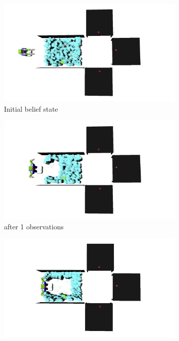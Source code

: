 \begin{figure}
  \centering
  \begin{subfigure}[b]{0.22\linewidth}
    \includegraphics[width=\textwidth]{corridor_images/0-observe.png}
    \caption{Initial belief state}
    \label{fig:step1}
  \end{subfigure}
  \begin{subfigure}[b]{0.22\linewidth}
    \includegraphics[width=\textwidth]{corridor_images/1-observe.png}
    \caption{after 1 observations}
    \label{fig:step2}
  \end{subfigure}
  \begin{subfigure}[b]{0.22\linewidth}
    \includegraphics[width=\textwidth]{corridor_images/2-observe.png}

\end{subfigure}
\end{figure}
